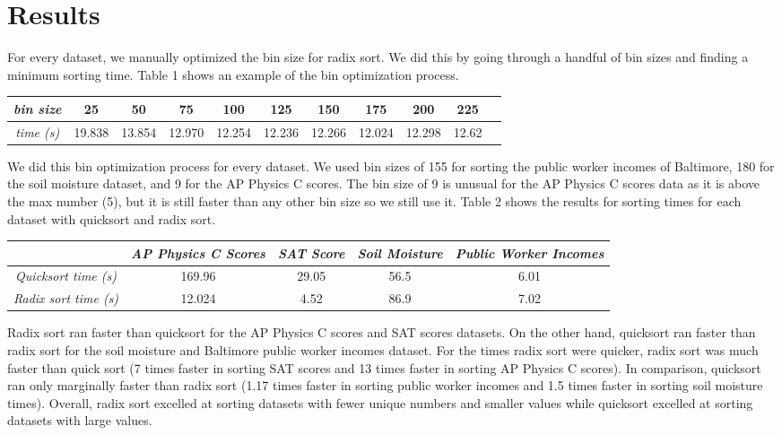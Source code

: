 \documentclass[11pt]{article}
\begin{document}
\section{Results}
For every dataset, we manually optimized the bin size for radix sort. We did this by going through a handful of bin sizes and finding a minimum sorting time. Table 1 shows an example of the bin optimization process.
\begin{center}
    \begin{tabular}{ |c|c|c|c|c|c|c|c|c|c|c| } 
     \hline
     \textit{bin size} & 25 & 50 & 75 & 100 & 125 & 150 & 175 & 200 & 225 \\ \hline
     \textit{time (s)} & 19.838  & 13.854 & 12.970 & 12.254 & 12.236 & 12.266 & 12.024 & 12.298 & 12.62 \\ \hline
    \end{tabular}
\end{center}

\noindent We did this bin optimization process for every dataset. We used bin sizes of 155 for sorting the public worker incomes of Baltimore, 180 for the soil moisture dataset, and 9 for the AP Physics C scores. The bin size of 9 is unusual for the AP Physics C scores data as it is above the max number (5), but it is still faster than any other bin size so we still use it. Table 2 shows the results for sorting times for each dataset with quicksort and radix sort.

\begin{center}
    \begin{tabular}{ |c|c|c|c|c| } 
     \hline
    & \textit{AP Physics C Scores} & \textit{SAT Score} & \textit{Soil Moisture} & \textit{Public Worker Incomes} \\ \hline
    \textit{Quicksort time (s)} & 169.96  & 29.05 & 56.5 & 6.01  \\ \hline
    \textit{Radix sort time (s)} & 12.024  & 4.52 & 86.9 & 7.02 \\ \hline
    \end{tabular}
\end{center}

\noindent Radix sort ran faster than quicksort for the AP Physics C scores and SAT scores datasets. On the other hand, quicksort ran faster than radix sort for the soil moisture and Baltimore public worker incomes dataset. For the times radix sort were quicker, radix sort was much faster than quick sort (7 times faster in sorting SAT scores and 13 times faster in sorting AP Physics C scores). In comparison, quicksort ran only marginally faster than radix sort (1.17 times faster in sorting public worker incomes and 1.5 times faster in sorting soil moisture times). Overall, radix sort excelled at sorting datasets with fewer unique numbers and smaller values while quicksort excelled at sorting datasets with large values.
\end{document}
